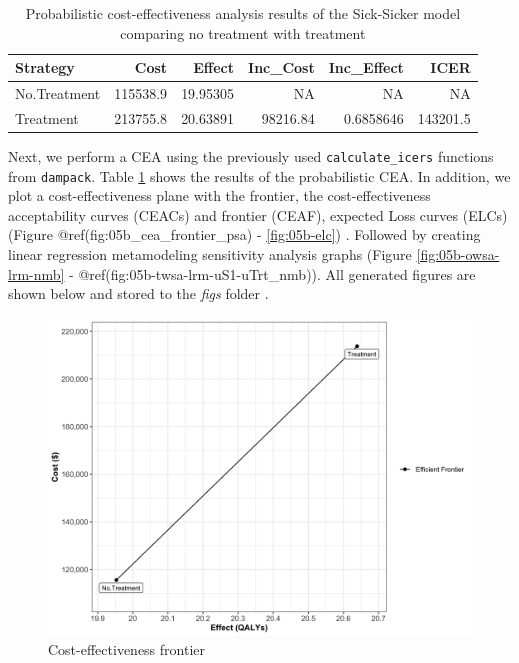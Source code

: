 \documentclass[]{book}
\begin{document}
\begin{table}[t]

\caption{\label{tab:df-cea-prob}Probabilistic cost-effectiveness analysis results of the Sick-Sicker model comparing no treatment with treatment}
\centering
\begin{tabular}{l|r|r|r|r|r}
\hline
Strategy & Cost & Effect & Inc\_Cost & Inc\_Effect & ICER\\
\hline
No.Treatment & 115538.9 & 19.95305 & NA & NA & NA\\
\hline
Treatment & 213755.8 & 20.63891 & 98216.84 & 0.6858646 & 143201.5\\
\hline
\end{tabular}
\end{table}

Next, we perform a CEA using the previously used
\texttt{calculate\_icers} functions from \texttt{dampack}. Table
\ref{tab:df-cea-prob} shows the results of the probabilistic CEA. In
addition, we plot a cost-effectiveness plane with the frontier, the
cost-effectiveness acceptability curves (CEACs) and frontier (CEAF),
expected Loss curves (ELCs) (Figure @ref(fig:05b\_cea\_frontier\_psa) -
\ref{fig:05b-elc}) \citep{Alarid-Escudero2019}. Followed by creating
linear regression metamodeling sensitivity analysis graphs (Figure
\ref{fig:05b-owsa-lrm-nmb} -
@ref(fig:05b-twsa-lrm-uS1-uTrt\_nmb))\citep{Jalal2013}. All generated
figures are shown below and stored to the \emph{figs} folder .

\begin{figure}

{\centering \includegraphics[width=1\linewidth]{../figs/05b_cea_frontier_psa} 

}

\caption{Cost-effectiveness frontier}\label{fig:05b-cea-frontier-psa}
\end{figure}
\end{document}
